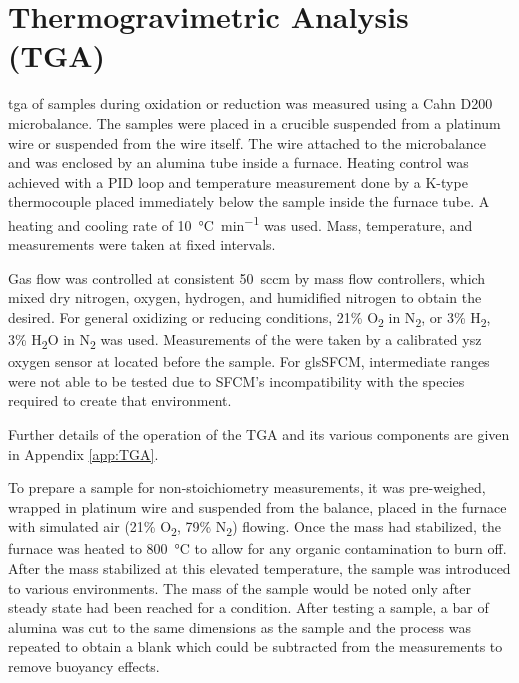 \section{Thermogravimetric Analysis (TGA)}
    \Gls{tga} of samples during oxidation or reduction was measured using a Cahn D200 microbalance.
    The samples were placed in a crucible suspended from a platinum wire or suspended from the wire itself.
    The wire attached to the microbalance and was enclosed by an alumina tube inside a furnace.
    Heating control was achieved with a PID loop and temperature measurement done by a K-type thermocouple placed immediately below the sample inside the furnace tube.
    A heating and cooling rate of \SI{10}{\celsius\per\minute} was used.
    Mass, temperature, and  measurements were taken at fixed intervals.

    Gas flow was controlled at consistent \SI{50}{sccm} by mass flow controllers, which mixed dry nitrogen, oxygen, hydrogen, and humidified nitrogen to obtain the  desired.
    For general oxidizing or reducing conditions, 21\% O\textsubscript{2} in N\textsubscript{2}, or 3\% H\textsubscript{2}, 3\% H\textsubscript{2}O in N\textsubscript{2} was used.
    Measurements of the  were taken by a calibrated \gls{ysz} oxygen sensor at  located before the sample.
    For gls{SFCM}, intermediate  ranges were not able to be tested due to SFCM's incompatibility with the species required to create that environment.

    Further details of the operation of the TGA and its various components are given in Appendix \ref{app:TGA}.

    To prepare a sample for non-stoichiometry measurements, it was pre-weighed, wrapped in platinum wire and suspended from the balance, placed in the furnace with simulated air (21\% O\textsubscript{2}, 79\% N\textsubscript{2}) flowing.
    Once the mass had stabilized, the furnace was heated to \SI{800}{\celsius} to allow for any organic contamination to burn off.
    After the mass stabilized at this elevated temperature, the sample was introduced to various environments.
    The mass of the sample would be noted only after steady state had been reached for a condition.
    After testing a sample, a bar of alumina was cut to the same dimensions as the sample and the process was repeated to obtain a blank which could be subtracted from the measurements to remove buoyancy effects.

